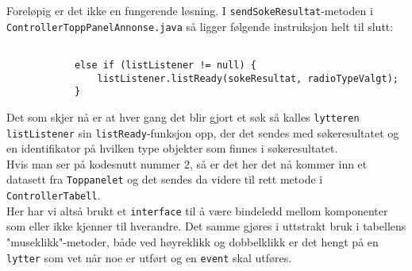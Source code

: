 Foreløpig er det ikke en fungerende løsning. I \texttt{sendSokeResultat}-metoden i \texttt{ControllerToppPanelAnnonse.java} så ligger følgende instruksjon helt til slutt:
\begin{lstlisting}[caption=Kodesnutt nummer 3: Utdrag fra \texttt{sendSokeResultat}-metoden i \texttt{ControllerToppPanelAnnonse.java}]

            else if (listListener != null) {
                listListener.listReady(sokeResultat, radioTypeValgt);
            }
\end{lstlisting}

Det som skjer nå er at hver gang det blir gjort et søk så kalles \texttt{lytteren listListener} sin \texttt{listReady}-funksjon opp, der det sendes med søkeresultatet og en identifikator på hvilken type objekter som finnes i søkeresultatet.\\
Hvis man ser på kodesnutt nummer 2, så er det her det nå kommer inn et datasett fra \texttt{Toppanelet} og det sendes da videre til rett metode i \texttt{ControllerTabell}.\\
Her har vi altså brukt et \texttt{interface} til å være bindeledd mellom komponenter som eller ikke kjenner til hverandre. Det samme gjøres i uttstrakt bruk i tabellens "museklikk"-metoder, både ved høyreklikk og dobbelklikk er det hengt på en \texttt{lytter} som vet når noe er utført og en \texttt{event} skal utføres.
 
